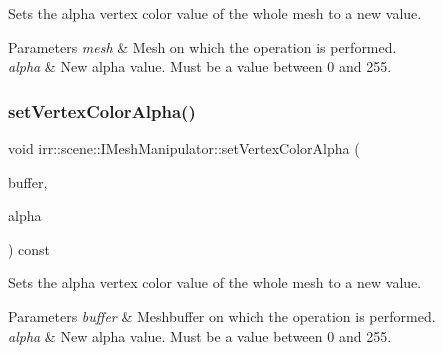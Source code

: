 Sets the alpha vertex color value of the whole mesh to a new value. 


\begin{DoxyParams}{Parameters}
{\em mesh} & Mesh on which the operation is performed. \\
\hline
{\em alpha} & New alpha value. Must be a value between 0 and 255. \\
\hline
\end{DoxyParams}
\mbox{\label{classirr_1_1scene_1_1IMeshManipulator_af69cbfcfd9286ccec2c6088a09dbe4a3}} 
\subsubsection{\texorpdfstring{set\+Vertex\+Color\+Alpha()}{setVertexColorAlpha()}\hspace{0.1cm}{\footnotesize\ttfamily [3/4]}}
{\footnotesize\ttfamily void irr\+::scene\+::\+I\+Mesh\+Manipulator\+::set\+Vertex\+Color\+Alpha (\begin{DoxyParamCaption}\item[{\hyperlink{classirr_1_1scene_1_1IMeshBuffer}{I\+Mesh\+Buffer} $\ast$}]{buffer,  }\item[{\hyperlink{namespaceirr_ac66849b7a6ed16e30ebede579f9b47c6}{s32}}]{alpha }\end{DoxyParamCaption}) const\hspace{0.3cm}{\ttfamily [inline]}}



Sets the alpha vertex color value of the whole mesh to a new value. 


\begin{DoxyParams}{Parameters}
{\em buffer} & Meshbuffer on which the operation is performed. \\
\hline
{\em alpha} & New alpha value. Must be a value between 0 and 255. \\
\hline
\end{DoxyParams}
\mbox{\label{classirr_1_1scene_1_1IMeshManipulator_af69cbfcfd9286ccec2c6088a09dbe4a3}} 
